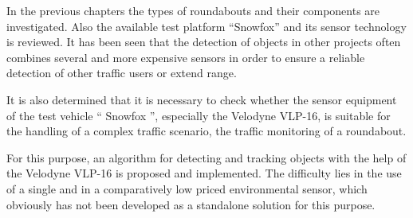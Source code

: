 \documentclass[11pt,oneside,openright]{mpreport}
\begin{document}


In the previous chapters the types of roundabouts and their components are investigated. Also the available test platform ``Snowfox'' and its sensor technology is reviewed.
It has been seen that the detection of objects in other projects often combines several and more expensive sensors in order to ensure a reliable detection of other traffic users or
extend range.


It is also determined that it is necessary to check whether the sensor equipment of the test vehicle `` Snowfox '', especially the Velodyne VLP-16, is suitable for the 
handling of a complex traffic scenario, the traffic monitoring of a roundabout.


For this purpose, an algorithm for detecting and tracking objects with the help of the Velodyne VLP-16 is proposed and implemented. 
The difficulty lies in the use of a single and in a comparatively low priced environmental sensor, which obviously has not been developed as a standalone solution for this purpose.
\end{document}
